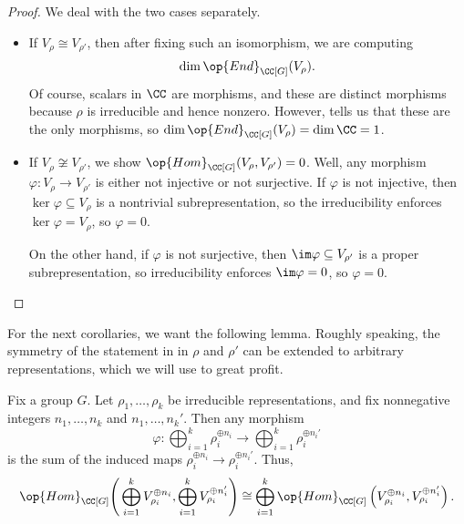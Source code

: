 \documentclass[../main.tex]{subfiles}
\begin{document}
\begin{proof}
	We deal with the two cases separately.
	\begin{itemize}
		\item If $V_\rho\cong V_{\rho'}$, then after fixing such an isomorphism, we are computing
		\[\dim\op{End}_{\CC[G]}(V_\rho).\]
		Of course, scalars in $\CC$ are morphisms, and these are distinct morphisms because $\rho$ is irreducible and hence nonzero. However,  tells us that these are the only morphisms, so $\dim\op{End}_{\CC[G]}(V_\rho)=\dim\CC=1$.
		\item If $V_\rho\not\cong V_{\rho'}$, we show $\op{Hom}_{\CC[G]}(V_\rho,V_{\rho'})=0$. Well, any morphism $\varphi\colon V_\rho\to V_{\rho'}$ is either not injective or not surjective. If $\varphi$ is not injective, then $\ker\varphi\subseteq V_\rho$ is a nontrivial subrepresentation, so the irreducibility enforces $\ker\varphi=V_\rho$, so $\varphi=0$.
		
		On the other hand, if $\varphi$ is not surjective, then $\im\varphi\subseteq V_{\rho'}$ is a proper subrepresentation, so irreducibility enforces $\im\varphi=0$, so $\varphi=0$.
		\qedhere
	\end{itemize}
\end{proof}
For the next corollaries, we want the following lemma. Roughly speaking, the symmetry of the statement in  in $\rho$ and $\rho'$ can be extended to arbitrary representations, which we will use to great profit.
\begin{lemma} \label{lem:isotypical-morphisms}
	Fix a group $G$. Let $\rho_1,\ldots,\rho_k$ be irreducible representations, and fix nonnegative integers $n_1,\ldots,n_k$ and $n_1,\ldots,n_k'$. Then any morphism
	\[\varphi\colon\bigoplus_{i=1}^k\rho_i^{\oplus n_i}\to\bigoplus_{i=1}^k\rho_i^{\oplus n_i'}\]
	is the sum of the induced maps $\rho_i^{\oplus n_i}\to\rho_i^{\oplus n_i'}$. Thus,
	\[\op{Hom}_{\CC[G]}\Bigg(\bigoplus_{i=1}^kV_{\rho_i}^{\oplus n_i},\bigoplus_{i=1}^kV_{\rho_i}^{\oplus n_i'}\Bigg)\cong\bigoplus_{i=1}^k\op{Hom}_{\CC[G]}\left(V_{\rho_i}^{\oplus n_i},V_{\rho_i}^{\oplus n_i'}\right).\]
\end{lemma}
\end{document}
